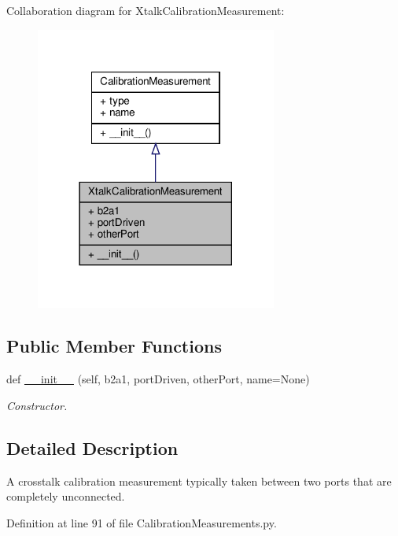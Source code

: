 Collaboration diagram for Xtalk\+Calibration\+Measurement\+:
\nopagebreak
\begin{figure}[H]
\begin{center}
\leavevmode
\includegraphics[width=225pt]{classSignalIntegrity_1_1Measurement_1_1Calibration_1_1CalibrationMeasurements_1_1XtalkCalibrationMeasurement__coll__graph}
\end{center}
\end{figure}
\subsection*{Public Member Functions}
\begin{DoxyCompactItemize}
\item 
def \hyperlink{classSignalIntegrity_1_1Measurement_1_1Calibration_1_1CalibrationMeasurements_1_1XtalkCalibrationMeasurement_aaea55d844f39221cb8663d6ef54a507d}{\+\_\+\+\_\+init\+\_\+\+\_\+} (self, b2a1, port\+Driven, other\+Port, name=None)
\begin{DoxyCompactList}\small\item\em Constructor. \end{DoxyCompactList}\end{DoxyCompactItemize}


\subsection{Detailed Description}
A crosstalk calibration measurement typically taken between two ports that are completely unconnected. 



Definition at line 91 of file Calibration\+Measurements.\+py.



